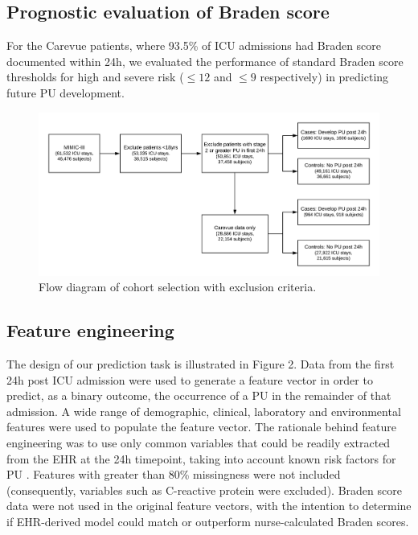 \documentclass{ws-procs11x85}
\begin{document}
\subsection{Prognostic evaluation of Braden score}
For the Carevue patients, where 93.5\% of ICU admissions had Braden score documented within 24h, we evaluated the performance of standard Braden score thresholds for high and severe risk ($\leq12$ and $\leq9$ respectively) in predicting future PU development. 


\begin{figure}[H]
  \centering
  \includegraphics[width=\textwidth]{figures/egems_fig1.png}
  \caption{\footnotesize Flow diagram of cohort selection with exclusion criteria.}
\end{figure}



\subsection{Feature engineering}
The design of our prediction task is illustrated in Figure 2. Data from the first 24h post ICU admission were used to generate a feature vector in order to predict, as a binary outcome, the occurrence of a PU in the remainder of that admission. A wide range of demographic, clinical, laboratory and environmental features were used to populate the feature vector. The rationale behind feature engineering was to use only common variables that could be readily extracted from the EHR at the 24h timepoint, taking into account known risk factors for PU \cite{cox}. Features with greater than 80\% missingness were not included (consequently, variables such as C-reactive protein were excluded). Braden score data were not used in the original feature vectors, with the intention to determine if EHR-derived model could match or outperform nurse-calculated Braden scores. 
\end{document}
